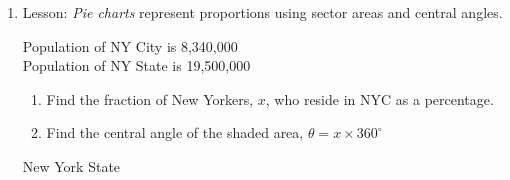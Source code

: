 \begin{enumerate}
\newpage
\item Lesson: \emph{Pie charts} represent proportions using sector areas and central angles.
  \begin{multicols}{2}
  \raggedcolumns
  Population of NY City is 8,340,000\\
Population of NY State is 19,500,000
  \begin{enumerate}%
    \item Find the fraction of New Yorkers, $x$, who reside in NYC as a percentage. \vspace{2cm}
    \item Find the central angle of the shaded area, $\theta = x \times 360^\circ$
  \end{enumerate}
  \columnbreak
  \begin{flushright}
    New York State
  \end{flushright}
  \end{multicols}


\end{enumerate}
